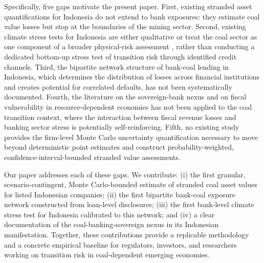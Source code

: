 Specifically, five gaps motivate the present paper. First, existing stranded asset quantifications for Indonesia \citep{sonny2016, Rishanty2023} do not extend to bank exposures: they estimate coal value losses but stop at the boundaries of the mining sector. Second, existing climate stress tests for Indonesia are either qualitative \citep{IESR2023} or treat the coal sector as one component of a broader physical-risk assessment \citep{IMF2024Indonesia}, rather than conducting a dedicated bottom-up stress test of transition risk through identified credit channels. Third, the bipartite network structure of bank-coal lending in Indonesia, which determines the distribution of losses across financial institutions and creates potential for correlated defaults, has not been systematically documented. Fourth, the literature on the sovereign-bank nexus \citep{Arellano2008} and on fiscal vulnerability in resource-dependent economies \citep{VanDerPloegVenables2011} has not been applied to the coal transition context, where the interaction between fiscal revenue losses and banking sector stress is potentially self-reinforcing. Fifth, no existing study provides the firm-level Monte Carlo uncertainty quantification necessary to move beyond deterministic point estimates and construct probability-weighted, confidence-interval-bounded stranded value assessments.

Our paper addresses each of these gaps. We contribute: (i) the first granular, scenario-contingent, Monte Carlo-bounded estimate of stranded coal asset values for listed Indonesian companies; (ii) the first bipartite bank-coal exposure network constructed from loan-level disclosures; (iii) the first bank-level climate stress test for Indonesia calibrated to this network; and (iv) a clear documentation of the coal-banking-sovereign nexus in its Indonesian manifestation. Together, these contributions provide a replicable methodology and a concrete empirical baseline for regulators, investors, and researchers working on transition risk in coal-dependent emerging economies.
